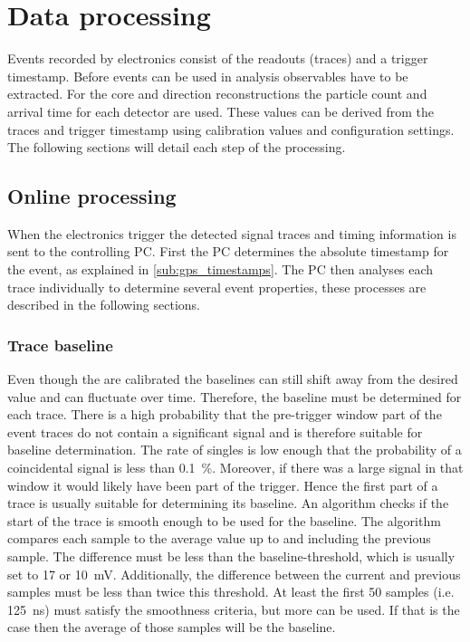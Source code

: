 \chapter{Data processing}
\label{ch:data_processing}

Events recorded by \hisparc electronics consist of the \pmt readouts (traces) and a trigger timestamp. Before events can be used in analysis observables have to be extracted. For the core and direction reconstructions the particle count and arrival time for each detector are used. These values can be derived from the traces and trigger timestamp using calibration values and configuration settings. The following sections will detail each step of the processing.


\section{Online processing}
\label{sec:online}

When the \hisparc electronics trigger the detected signal traces and timing information is sent to the controlling PC. First the PC determines the absolute \gps timestamp for the event, as explained in \cref{sub:gps_timestamps}. The PC then analyses each trace individually to determine several event properties, these processes are described in the following sections.


\subsection{Trace baseline}

Even though the \adcs are calibrated the baselines can still shift away from the desired value and can fluctuate over time. Therefore, the baseline must be determined for each trace. There is a high probability that the pre-trigger window part of the event traces do not contain a significant signal and is therefore suitable for baseline determination. The rate of singles is low enough that the probability of a coincidental signal is less than \SI{0.1}{\percent}. Moreover, if there was a large signal in that window it would likely have been part of the trigger. Hence the first part of a trace is usually suitable for determining its baseline. An algorithm checks if the start of the trace is smooth enough to be used for the baseline. The algorithm compares each sample to the average value up to and including the previous sample. The difference must be less than the baseline-threshold, which is usually set to \SI{17}{\adc} or \SI{10}{\milli\volt}. Additionally, the difference between the current and previous samples must be less than twice this threshold. At least the first 50 samples (i.e. \SI{125}{\ns}) must satisfy the smoothness criteria, but more can be used. If that is the case then the average of those samples will be the baseline.


